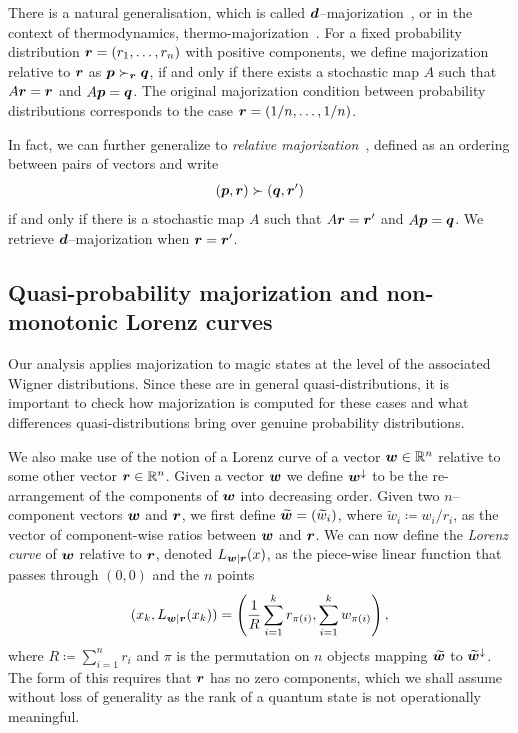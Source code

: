 \documentclass[pra,
aps,
twocolumn,
superscriptaddress,
groupedaddress,
nofootinbib,
reprint
]{revtex4-1}
\begin{document}
There is a natural generalisation, which is called $\bm{d}$--majorization~\cite{Veinott_1971}, or in the context of thermodynamics, thermo-majorization~\cite{cit:horodecki2013}. For a fixed probability distribution $\boldsymbol{r} = (r_1, \dots, r_n)$ with positive components, we define majorization relative to $\boldsymbol{r}$ as $\boldsymbol{p} \succ_{\boldsymbol{r}} \boldsymbol{q}$, if and only if there exists a stochastic map $A$ such that $A\boldsymbol{r} = \boldsymbol{r}$ and $A \boldsymbol{p} = \boldsymbol{q}$. The original majorization condition between probability distributions corresponds to the case $\boldsymbol{r} = (1/n, \dots, 1/n)$. 

In fact, we can further generalize to \emph{relative majorization}~\cite{Blackwell_1953, Ruch_1976, ruch_mixing_1978, Renes_2016, Buscemi_2017, Rethinasamy_2020}, defined as an ordering between pairs of vectors and write 
\begin{equation}
	(\boldsymbol{p},\boldsymbol{r}) \succ (\boldsymbol{q}, \boldsymbol{r}')
\end{equation}
if and only if there is a stochastic map $A$ such that $A\boldsymbol{r} = \boldsymbol{r}'$ and $A\boldsymbol{p} = \boldsymbol{q}$. We retrieve $\bm{d}$--majorization when $\boldsymbol{r} = \boldsymbol{r}'$.

\subsection{Quasi-probability majorization and non-monotonic Lorenz curves}
\label{sec:lc}

Our analysis applies majorization to magic states at the level of the associated Wigner distributions. Since these are in general quasi-distributions, it is important to check how majorization is computed for these cases and what differences quasi-distributions bring over genuine probability distributions.

We also make use of the notion of a Lorenz curve of a vector $\boldsymbol{w} \in \mathbb{R}^n$ relative to some other vector $\boldsymbol{r} \in \mathbb{R}^n$. Given a vector $\boldsymbol{w}$ we define $\boldsymbol{w}^\downarrow$ to be the re-arrangement of the components of $\boldsymbol{w}$ into decreasing order. Given two $n$--component vectors $\boldsymbol{w}$ and $\boldsymbol{r}$, we first define $\widetilde{\boldsymbol{w}}=(\widetilde{w}_i)$, where $\widetilde{w}_i \coloneqq w_i/r_i$, as the vector of component-wise ratios between $\boldsymbol{w}$ and $\boldsymbol{r}$.
We can now define the \emph{Lorenz curve} of $\boldsymbol{w}$ relative to $\boldsymbol{r}$, denoted $L_{\boldsymbol{w}|\boldsymbol{r}}(x)$, as the piece-wise linear function that passes through $(0,0)$ and the $n$ points
\begin{equation}
\label{eq:lc}
        (x_k,L_{\boldsymbol{w}|\boldsymbol{r}}(x_k)) =\left( \frac{1}{R}\sum_{i=1}^k r_{\pi(i)}, \sum_{i=1}^k w_{\pi(i)} \right),
\end{equation}
where $R\coloneqq \sum_{i=1}^n r_i$ and $\pi$ is the permutation on $n$ objects mapping $\widetilde{\boldsymbol{w}}$ to $\widetilde{\boldsymbol{w}}^{\downarrow}$. The form of this requires that $\boldsymbol{r}$ has no zero components, which we shall assume without loss of generality as the rank of a quantum state is not operationally meaningful.
\end{document}
